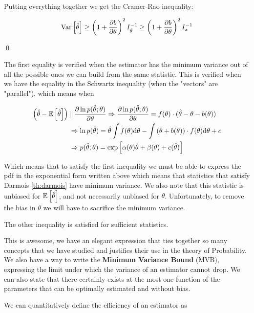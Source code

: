 \begin{example}
	Putting everything together we get the Cramer-Rao inequality:
	
	\[
	\operatorname{Var}\left[\hat\theta\right]\geq \left(1+\frac{\partial b}{\partial\theta}\right)^2 I_{\hat\theta}^{-1} \geq \left(1+\frac{\partial b}{\partial\theta}\right)^2 I_{x}^{-1}
	\]
	
	\qed
	
	The first equality is verified when the estimator has the minimum variance out of all the possible ones we can build from the same statistic. This is verified when we have the equality in the Schwartz inequality (when the "vectors" are "parallel"), which means when
	
	\begin{align*}
	\left(\hat\theta - \mathbb{E}\left[\hat\theta\right]\right)\, &||\, \frac{\partial\ln p (\hat\theta;\theta)}{\partial\theta} \Rightarrow \frac{\partial\ln p(\hat\theta;\theta)}{\partial\theta} = f(\theta) \cdot (\hat\theta-\theta-b(\theta))\\
	&\Rightarrow \ln p(\hat\theta) = \hat\theta\int f(\theta)\mathrm{d} \theta - \int \left(\theta+b(\theta)\right)\cdot f(\theta)\mathrm{d} \theta +c\\
	&\Rightarrow p(\hat\theta;\theta) = \exp\left[\alpha(\theta)\hat\theta+\beta(\theta)+c(\hat\theta)\right]
	\end{align*}
	
	Which means that to satisfy the first inequality we must be able to express the pdf in the exponential form written above which means that statistics that satisfy Darmois \ref{th:darmois} have minimum variance. We also note that this statistic is unbiased for $\mathbb{E}\left[\hat\theta\right]$, and not necessarily unbiased for $\theta$. Unfortunately, to remove the bias in $\theta$ we will have to sacrifice the minimum variance. 
	
	The other inequality is satisfied for sufficient statistics. 
\label{def:CR}
\end{example}

This is awesome, we have an elegant expression that ties together so many concepts that we have studied and justifies their use in the theory of Probability. We also have a way to write the \textbf{Minimum Variance Bound} (MVB), expressing the limit under which the variance of an estimator cannot drop. We can also state that there certainly exists at the most one function of the parameters that can be optimally estimated and without bias.

 We can quantitatively define the efficiency of an estimator as
 

